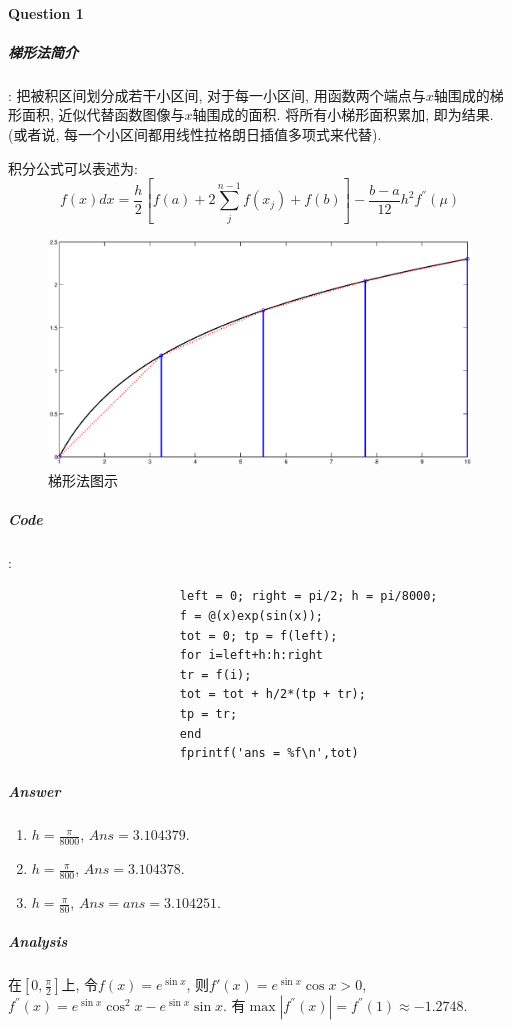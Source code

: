 \documentclass{article}
\begin{document}
\begin{CJK*}{UTF8}{song}
			\paragraph{Question 1}
				\subparagraph{梯形法简介}:
					把被积区间划分成若干小区间, 对于每一小区间, 用函数两个端点与$x$轴围成的梯形面积, 近似代替函数图像与$x$轴围成的面积. 将所有小梯形面积累加, 即为结果.(或者说, 每一个小区间都用线性拉格朗日插值多项式来代替).
					
					积分公式可以表述为:
					$$f\left(x \right) dx = \frac{h}{2}\left[ f\left(a\right) + 2\sum_{j}^{n-1}f\left(x_j\right) + f\left(b\right)\right] - \frac{b-a}{12}h^2f^{''}\left(\mu\right)$$
					\begin{figure}[H]
						\centering
						\includegraphics[width=1.0\textwidth]{../chapter4_1_txf.eps}
						\caption{梯形法图示}
						\label{img_chapter4_1_txf}
					\end{figure}
				\subparagraph{Code}
				:\newline
					\begin{lstlisting}
						left = 0; right = pi/2; h = pi/8000;
						f = @(x)exp(sin(x));
						tot = 0; tp = f(left);
						for i=left+h:h:right
						tr = f(i);
						tot = tot + h/2*(tp + tr);
						tp = tr;
						end
						fprintf('ans = %f\n',tot)
					\end{lstlisting}
				\subparagraph{Answer}
					\begin{enumerate}
						\item $h = \frac{\pi}{8000}$, $Ans = 3.104379$.
						\item $h = \frac{\pi}{800}$, $Ans = 3.104378$.
						\item $h = \frac{\pi}{80}$, $Ans = ans = 3.104251$.
					\end{enumerate}
				\subparagraph{Analysis}
					在$\left[0,\frac{\pi}{2}\right]$上, 
					令$f\left(x\right) = e^{\sin x}$, 则$f'\left(x\right) = e^{\sin x} \cos x > 0$,
					$f^{''}\left(x\right) = e^{\sin x} \cos^2 x - e^{\sin x}\sin x$. 有$\max \left| f^{''}\left(x\right)\right| = f^{''}\left(1\right) \approx  -1.2748$.
					

\end{CJK*}
\end{document}
